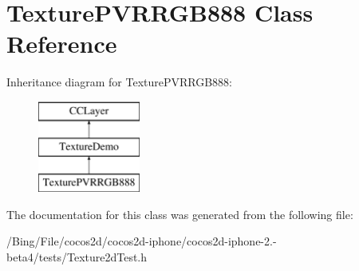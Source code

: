 \hypertarget{interface_texture_p_v_r_r_g_b888}{\section{Texture\-P\-V\-R\-R\-G\-B888 Class Reference}
\label{interface_texture_p_v_r_r_g_b888}
}
Inheritance diagram for Texture\-P\-V\-R\-R\-G\-B888\-:\begin{figure}[H]
\begin{center}
\leavevmode
\includegraphics[height=3.000000cm]{interface_texture_p_v_r_r_g_b888}
\end{center}
\end{figure}


The documentation for this class was generated from the following file\-:\begin{DoxyCompactItemize}
\item 
/\-Bing/\-File/cocos2d/cocos2d-\/iphone/cocos2d-\/iphone-\/2.-\/beta4/tests/Texture2d\-Test.\-h\end{DoxyCompactItemize}
